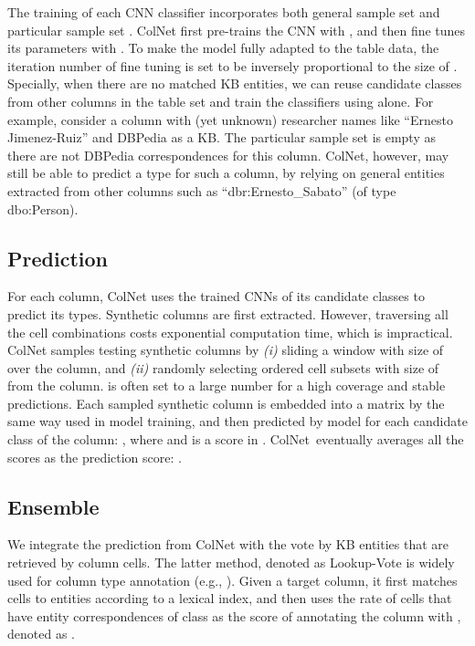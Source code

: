 \documentclass[letterpaper]{article}
\newcommand{\rv}[1]{{\color{black}#1}}
\newcommand{\camera}[1]{{\color{black}#1}}
\newcommand{\ColNet}{\textsf{ColNet}\xspace}
\begin{document}
The training of each CNN classifier \rv{incorporates both general sample set  and particular sample set .
\ColNet first pre-trains the CNN with ,
and then fine tunes its parameters with .
To make the model fully adapted to the table data, 
the iteration number of fine tuning is set to be inversely proportional to the size of }.
\camera{Specially, when there are no matched KB entities,
we can reuse candidate classes from other columns in the table set and train the classifiers using  alone. 
For example, consider a column with (yet unknown) researcher names like ``Ernesto Jimenez-Ruiz'' and DBPedia as a KB. The particular sample set  is empty as there are not DBPedia correspondences for this column. \ColNet, however, may still be able to predict a type for such a column, by relying on general entities extracted from other columns such as ``dbr:Ernesto\_Sabato'' (of type dbo:Person).
}
\medskip
\subsection{\rv{Prediction}}

\rv{For each column,
\ColNet uses the trained CNNs of its candidate classes to predict its types.
Synthetic columns are first extracted.
However, traversing all the cell combinations}
costs exponential computation time,
which is impractical.
\ColNet samples  testing synthetic columns
by \textit{(i)} sliding a window with size of  over the column, and 
\textit{(ii)} randomly selecting ordered cell subsets with size of  from the column.
 is often set to a large number for a high coverage and stable predictions.
Each sampled synthetic column is embedded into a matrix by the same way used in model training,
and then predicted by model 
 for each candidate class  of the column:
, where  and  is a score in .
\ColNet~\rv{eventually averages all the scores as the prediction score:}
.


\subsection{Ensemble}
\rv{
We integrate the prediction from \ColNet with the 
vote by KB entities that are retrieved by column cells.
The latter method, denoted as Lookup-Vote is widely used for column type annotation (e.g., \cite{zwicklbauer2013towards}).}
\rv{Given a target column,
it first matches cells to entities according to a lexical index,
and then uses the rate of cells that have entity correspondences of class  as the score of annotating the column with , denoted as .
}
\end{document}
